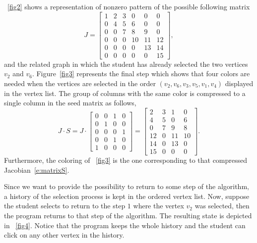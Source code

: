 \documentclass[12pt, twoside,a4paper,toc=bibliography]{scrbook}
\newcommand{\figref}[1]{Figure~\protect\ref{#1}}
\begin{document}
\figurename~\ref{fig2} shows a representation of nonzero pattern of the possible following matrix
\begin{equation}
\label{e:matrixJ}
J =
\begin{bmatrix}
1 & 2 & 3 & 0 & 0 & 0 \\
0 & 4 & 5 & 6 & 0 & 0 \\
0 & 0 & 7 & 8 & 9 & 0\\
0 & 0 & 0 & 10 & 11 & 12\\
0 & 0 & 0 & 0 & 13 & 14 \\
0 & 0 & 0 & 0 & 0 & 15
\end{bmatrix},
\end{equation}
and the related graph in which the student has already selected the two vertices $v_2$ and $v_6$. \figref{fig3} represents the final step which shows that four colors are needed when the vertices are selected in the order $(v_2, v_6, v_3, v_5, v_1, v_4)$ displayed in the vertex list. The group of columns with the same color is compressed to a single column in the seed matrix as follows,
\begin{equation}
\label{e:matrixS}
J \cdot S =
J \cdot
\begin{bmatrix}
0 & 0 & 1 & 0 \\
0 & 1 & 0 & 0 \\
0 & 0 & 0 & 1 \\
0 & 0 & 1 & 0 \\
1 & 0 & 0 & 0
\end{bmatrix}
=
\begin{bmatrix}
2 & 3 & 1 & 0 \\
4 & 5 & 0 & 6 \\
0 & 7 & 9 & 8 \\
12 & 0 & 11 & 10\\
14 & 0 & 13 & 0 \\
15 & 0 & 0 & 0
\end{bmatrix}.
\end{equation}
Furthermore, the coloring of \figurename~\ref{fig3} is the one corresponding to that compressed Jacobian~\eqref{e:matrixS}.

Since we want to provide the possibility to return to some step of the algorithm, a history of the selection process is kept in the ordered vertex list. Now, suppose the student selects to return to the step $1$ where the vertex $v_2$ was selected, then the program returns to that step of the algorithm. The resulting state is depicted in \figurename~\ref{fig4}. Notice that the program keeps the whole history and the student can click on any other vertex in the history.
\end{document}
